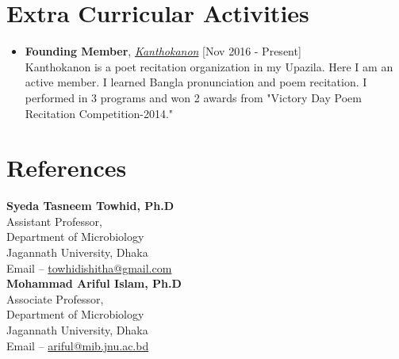 \documentclass[11pt,a4paper]{moderncv}
\begin{document}
\section{Extra Curricular Activities}
\begin{itemize}
	\item \textbf{Founding Member}, 
	\textit{\href{https://hdrobd.org/}{Kanthokanon}} 
	\hfill [Nov 2016 - Present]\\ 
	Kanthokanon is a poet recitation organization in my Upazila. Here I am an 
	active member. I learned Bangla pronunciation and poem recitation. I 
	performed in 3 programs and won 2 awards from "Victory Day Poem Recitation 
	Competition-2014."
\end{itemize}

	
\section{References}
\begin{multicols}{2}

\textbf{Syeda Tasneem Towhid, Ph.D}\\ 
Assistant Professor, \\ 
Department of Microbiology \\ 
Jagannath University, Dhaka \\ 
Email -- \url{towhidishitha@gmail.com} \\ 

\columnbreak 
\textbf{Mohammad Ariful Islam, Ph.D}\\ 
Associate Professor,\\ 
Department of Microbiology \\ 
Jagannath University, Dhaka \\ 
Email -- \url{ariful@mib.jnu.ac.bd}
	
\end{multicols} 
\end{document}
